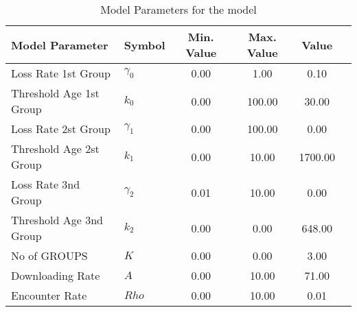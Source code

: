 \begin{table}
\centering
\begin{tabular}{p{5cm}lcccc}
{\bf Model Parameter} & {\bf Symbol} & {\bf Min. Value} & {\bf Max. Value} & {\bf Value}\\
\hline\hline
Loss Rate 1st Group & $\gamma_0$ & 0.00 & 1.00 & 0.10\\
Threshold Age 1st Group & $k_0$ & 0.00 & 100.00 & 30.00\\
Loss Rate 2st Group & $\gamma_1$ & 0.00 & 100.00 & 0.00\\
Threshold Age 2st Group & $k_1$ & 0.00 & 10.00 & 1700.00\\
Loss Rate 3nd Group & $\gamma_2$ & 0.01 & 10.00 & 0.00\\
Threshold Age 3nd Group & $k_2$ & 0.00 & 0.00 & 648.00\\
No of GROUPS & $K$ & 0.00 & 0.00 & 3.00\\
Downloading Rate & $A$ & 0.00 & 10.00 & 71.00\\
Encounter Rate & $Rho$ & 0.00 & 10.00 & 0.01\\
\hline\hline
\end{tabular}
\caption{Model Parameters for the model}
\end{table}
